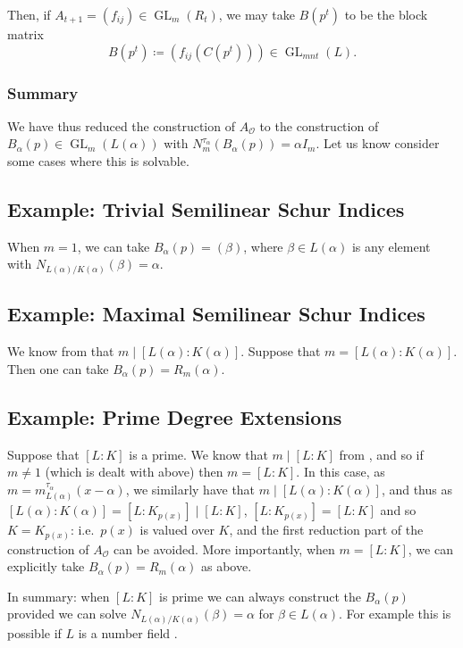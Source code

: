 \documentclass[10pt, reqno, hidelinks]{amsart}
\newcommand{\OO}{\mathcal{O}}
\DeclareMathOperator{\GL}{GL}
\numberwithin{thm}{subsection}
\theoremstyle{definition}
\begin{document}
Then, if $A_{t+1} = (f_{ij}) \in \GL_m(R_t)$, we may take $B(p^t)$ to be the block matrix
\[
B(p^t) \coloneqq (f_{ij}(C(p^t))) \in \GL_{mnt}(L).
\]

\subsubsection*{Summary} We have thus reduced the construction of $A_{\OO}$ to the construction of $B_{\alpha}(p) \in \GL_{m}(L(\alpha))$ with $N_{m}^{\tau_{\alpha}}(B_{\alpha}(p)) = \alpha I_m$. Let us know consider some cases where this is solvable.

\subsection{Example: Trivial Semilinear Schur Indices}

When $m = 1$, we can take $B_{\alpha}(p) = (\beta)$, where $\beta \in L(\alpha)$ is any element with $N_{L(\alpha) / K(\alpha)}(\beta) = \alpha$.

\subsection{Example: Maximal Semilinear Schur Indices} We know from \cite[Prop.\ 9.3(6)]{TAYSchur} that $m \mid [L(\alpha) : K(\alpha)]$. Suppose that $m = [L(\alpha) : K(\alpha)]$. Then one can take $B_{\alpha}(p) = R_m(\alpha)$.

\subsection{Example: Prime Degree Extensions} Suppose that $[L:K]$ is a prime. We know that $m \mid [L:K]$ from \cite[Prop.\ 9.3(6)]{TAYSchur}, and so if $m \neq 1$ (which is dealt with above) then $m = [L:K]$. In this case, as $m = m_{L(\alpha)}^{\tau_{\alpha}}(x - \alpha)$, we similarly have that $m \mid [L(\alpha) : K(\alpha)]$, and thus as $[L(\alpha) : K(\alpha)] = [L : K_{p(x)}] \mid [L:K]$, $[L : K_{p(x)}] = [L:K]$ and so $K = K_{p(x)}$: i.e.\ $p(x)$ is valued over $K$, and the first reduction part of the construction of $A_{\OO}$ can be avoided. More importantly, when $m = [L:K]$, we can explicitly take $B_{\alpha}(p) = R_m(\alpha)$ as above.

In summary: when $[L:K]$ is prime we can always construct the $B_{\alpha}(p)$ provided we can solve $N_{L(\alpha) / K(\alpha)}(\beta) = \alpha$ for $\beta \in L(\alpha)$. For example this is possible if $L$ is a number field \cite{Denis}.
\end{document}
